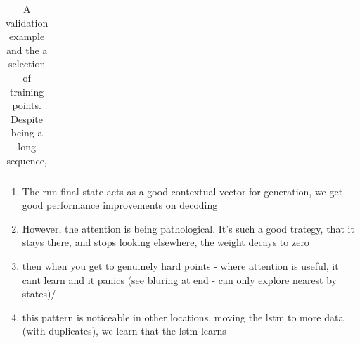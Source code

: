 \begin{table}
\begin{center}
\begin{tabular}{l}
\end{tabular}

\caption{A validation example and the a selection of training points. Despite being a long sequence, }
\end{center}
\end{table}

\begin{enumerate}
    \item The rnn final state acts as a good contextual vector for generation, we get good performance improvements on decoding
    \item However, the attention is being pathological. It's such a good trategy, that it stays there, and stops looking elsewhere, the weight decays to zero
    \item then when you get to genuinely hard points - where attention is useful, it cant learn and it panics (see bluring at end - can only explore nearest by states)/
    \item this pattern is noticeable in other locations, moving the lstm to more data (with duplicates), we learn that the lstm learns
\end{enumerate}


